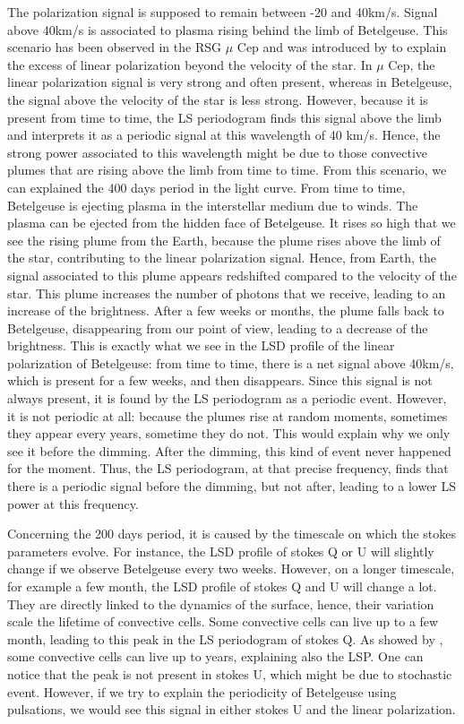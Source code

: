 \documentclass{aa}
\begin{document}
The polarization signal is supposed to remain between -20 and 40km/s. Signal above 40km/s is associated to plasma rising behind the limb of Betelgeuse. 
This scenario has been observed in the RSG $\mu$ Cep and was introduced by \cite{lopez_ariste_height_2023} to explain the excess of linear polarization beyond 
the velocity of the star. In $\mu$ Cep, the linear polarization signal is very strong and often present, whereas in Betelgeuse, the signal above the 
velocity of the star is less strong. However, because it is present from time to time, the LS periodogram finds this signal above the limb and interprets it as a
periodic signal at this wavelength of 40 km/s. Hence, the strong power associated to this wavelength might be due to those convective plumes that are 
rising above the limb from time to time. From this scenario, we can explained the 400 days period in the light curve. From time to time,
Betelgeuse is ejecting plasma in the interstellar medium due to winds. The plasma can be ejected from the hidden face of Betelgeuse. 
It rises so high that we see the rising plume from the Earth, because the plume rises above the limb of the star, contributing to the linear polarization signal. Hence, from Earth, 
the signal associated to this plume appears redshifted compared to the velocity of the star. This plume increases the number of photons that we receive,
leading to an increase of the brightness. After a few weeks or months, the plume falls back to Betelgeuse, disappearing from our point of view, 
leading to a decrease of the brightness.
This is exactly what we see in the LSD profile of the linear polarization of Betelgeuse: 
from time to time, there is a net signal above 40km/s, which is present for a few weeks, and then disappears. Since this signal is not always present, 
it is found by the LS periodogram as a periodic event. However, it is not periodic at all: because the plumes rise at random moments, sometimes they 
appear every years, sometime they do not. This would explain why we only see it before the dimming. After the dimming, this kind of event never happened 
for the moment. Thus, the LS periodogram, at that precise frequency, finds that there is a periodic signal before the dimming, but not after, leading to
a lower LS power at this frequency.

Concerning the 200 days period, it is caused by the timescale on which the stokes parameters evolve. For instance, the 
LSD profile of stokes Q or U will slightly change if we observe Betelgeuse every two weeks. However, on a longer timescale, for example a few month, 
the LSD profile of stokes Q and U will change a lot. They are directly linked to the dynamics of the surface, hence,  their variation scale the lifetime 
of convective cells. Some convective cells can live up to a few month, leading to this peak in the LS periodogram of stokes Q. As showed by
\cite{lopez_ariste_convective_2018}, some convective cells can live up to years, explaining also the LSP. One can notice that the peak is not present in stokes U, which might be due to stochastic event. 
However, if we try to explain the periodicity of Betelgeuse using pulsations, we would see this signal in either stokes U and the linear polarization. 
\end{document}
